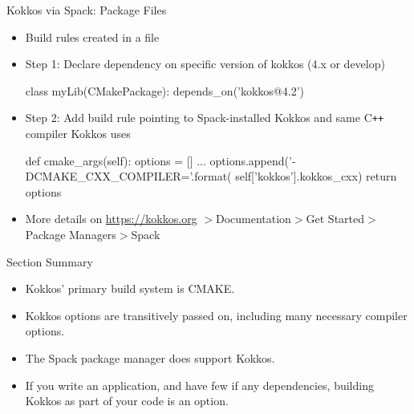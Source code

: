 \begin{frame}[fragile]{Kokkos via Spack: Package Files}
\begin{itemize}
\item Build rules created in a  file
\item Step 1: Declare dependency on specific version of kokkos (4.x or develop)
\begin{shell}
class myLib(CMakePackage):
  depends_on('kokkos@4.2')
\end{shell}
\item Step 2: Add build rule pointing to Spack-installed Kokkos and same C\texttt{++} compiler Kokkos uses
\begin{shell}
def cmake_args(self):
  options = []
  ...
  options.append('-DCMAKE_CXX_COMPILER={}'.format(
      self['kokkos'].kokkos_cxx)
  return options
\end{shell}
\item More details on \url{https://kokkos.org} $>$Documentation$>$Get Started$>$Package Managers$>$Spack
\end{itemize}
\end{frame}

\begin{frame}{Section Summary}

  \begin{itemize}
    \item{Kokkos' primary build system is CMAKE.}
    \item{Kokkos options are transitively passed on, including many necessary compiler options.}
    \item{The Spack package manager does support Kokkos.}
    \item{If you write an application, and have few if any dependencies, building Kokkos as part of your code is an option.}
  \end{itemize}

\end{frame}

